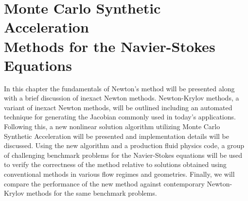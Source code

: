 \chapter{Monte Carlo Synthetic Acceleration\\ Methods for the
  Navier-Stokes\\ Equations\ }
\label{ch:nonlinear_problem}

In this chapter the fundamentals of Newton's method will be presented
along with a brief discussion of inexact Newton methods. Newton-Krylov
methods, a variant of inexact Newton methods, will be outlined
including an automated technique for generating the Jacobian commonly
used in today's applications. Following this, a new nonlinear solution
algorithm utilizing Monte Carlo Synthetic Acceleration will be
presented and implementation details will be discussed. Using the new
algorithm and a production fluid physics code, a group of challenging
benchmark problems for the Navier-Stokes equations will be used to
verify the correctness of the method relative to solutions obtained
using conventional methods in various flow regimes and
geometries. Finally, we will compare the performance of the new method
against contemporary Newton-Krylov methods for the same benchmark
problems.

